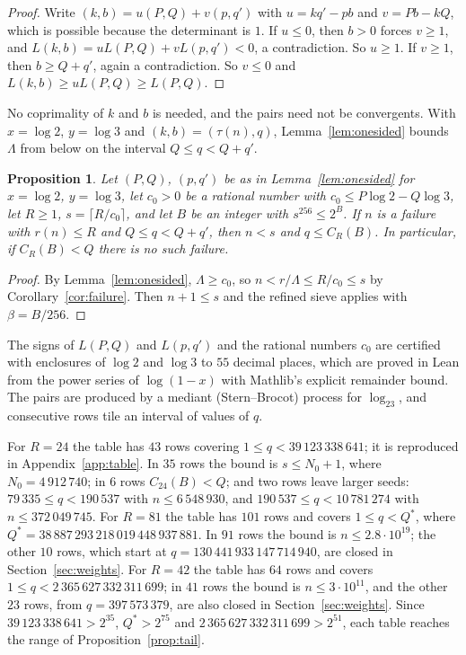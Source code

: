 \documentclass[11pt]{amsart}
\newtheorem{proposition}[theorem]{Proposition}
\theoremstyle{definition}
\theoremstyle{remark}
\newcommand{\Nzero}{4\,912\,740}
\begin{document}
\begin{proof}
Write $(k,b)=u(P,Q)+v(p,q')$ with $u=kq'-pb$ and $v=Pb-kQ$, which is possible because the determinant is $1$. If $u\le0$, then $b>0$ forces $v\ge1$, and $L(k,b)=uL(P,Q)+vL(p,q')<0$, a contradiction. So $u\ge1$. If $v\ge1$, then $b\ge Q+q'$, again a contradiction. So $v\le0$ and $L(k,b)\ge uL(P,Q)\ge L(P,Q)$.
\end{proof}

No coprimality of $k$ and $b$ is needed, and the pairs need not be convergents. With $x=\log2$, $y=\log3$ and $(k,b)=(\tau(n),q)$, Lemma~\ref{lem:onesided} bounds $\Lambda$ from below on the interval $Q\le q<Q+q'$.

\begin{proposition}\label{prop:row}
Let $(P,Q)$, $(p,q')$ be as in Lemma~\ref{lem:onesided} for $x=\log2$, $y=\log3$, let $c_0>0$ be a rational number with $c_0\le P\log2-Q\log3$, let $R\ge1$, $s=\lceil R/c_0\rceil$, and let $B$ be an integer with $s^{256}\le2^{B}$. If $n$ is a failure with $r(n)\le R$ and $Q\le q<Q+q'$, then $n<s$ and $q\le C_R(B)$. In particular, if $C_R(B)<Q$ there is no such failure.
\end{proposition}

\begin{proof}
By Lemma~\ref{lem:onesided}, $\Lambda\ge c_0$, so $n<r/\Lambda\le R/c_0\le s$ by Corollary~\ref{cor:failure}. Then $n+1\le s$ and the refined sieve applies with $\beta=B/256$.
\end{proof}

The signs of $L(P,Q)$ and $L(p,q')$ and the rational numbers $c_0$ are certified with enclosures of $\log2$ and $\log3$ to $55$ decimal places, which are proved in Lean from the power series of $\log(1-x)$ with Mathlib's explicit remainder bound. The pairs are produced by a mediant (Stern--Brocot) process for $\log_23$, and consecutive rows tile an interval of values of $q$.

For $R=24$ the table has $43$ rows covering $1\le q<39\,123\,338\,641$; it is reproduced in Appendix~\ref{app:table}. In $35$ rows the bound is $s\le N_0+1$, where $N_0=\Nzero$; in $6$ rows $C_{24}(B)<Q$; and two rows leave larger seeds: $79\,335\le q<190\,537$ with $n\le6\,548\,930$, and $190\,537\le q<10\,781\,274$ with $n\le372\,049\,745$. For $R=81$ the table has $101$ rows and covers $1\le q<Q^{*}$, where $Q^{*}=38\,887\,293\,218\,019\,448\,937\,881$. In $91$ rows the bound is $n\le2.8\cdot10^{19}$; the other $10$ rows, which start at $q=130\,441\,933\,147\,714\,940$, are closed in Section~\ref{sec:weights}. For $R=42$ the table has $64$ rows and covers $1\le q<2\,365\,627\,332\,311\,699$; in $41$ rows the bound is $n\le3\cdot10^{11}$, and the other $23$ rows, from $q=397\,573\,379$, are also closed in Section~\ref{sec:weights}. Since $39\,123\,338\,641>2^{35}$, $Q^{*}>2^{75}$ and $2\,365\,627\,332\,311\,699>2^{51}$, each table reaches the range of Proposition~\ref{prop:tail}.
\end{document}
